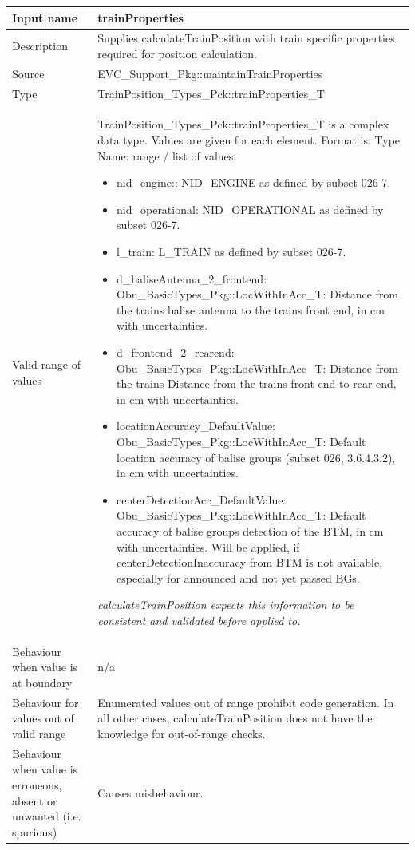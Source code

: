 \begin{longtable}{p{}p{}}
\toprule
Input name				& trainProperties \\
\midrule
Description				& Supplies calculateTrainPosition with train specific properties required for position calculation.   \\
\midrule
Source					& EVC\_Support\_Pkg::maintainTrainProperties \\ 
\midrule
Type					& TrainPosition\_Types\_Pck::trainProperties\_T \\  
\midrule
Valid range of values	& TrainPosition\_Types\_Pck::trainProperties\_T is a complex data type. Values are given for each element. Format is: Type Name: range / list of values.
\begin{itemize}
\item nid\_engine:: NID\_ENGINE as defined by subset 026-7. 
\item nid\_operational: NID\_OPERATIONAL as defined by subset 026-7. 
\item l\_train: L\_TRAIN as defined by subset 026-7. 
\item d\_baliseAntenna\_2\_frontend: Obu\_BasicTypes\_Pkg::LocWithInAcc\_T:  Distance from the trains balise antenna to the trains front end, in cm with uncertainties. 
\item d\_frontend\_2\_rearend: Obu\_BasicTypes\_Pkg::LocWithInAcc\_T:  Distance from the trains Distance from the trains front end to rear end, in cm with uncertainties. 
\item locationAccuracy\_DefaultValue: Obu\_BasicTypes\_Pkg::LocWithInAcc\_T:  Default location accuracy of balise groups (subset 026, 3.6.4.3.2), in cm with uncertainties. 
\item centerDetectionAcc\_DefaultValue: Obu\_BasicTypes\_Pkg::LocWithInAcc\_T:  Default  accuracy of balise groups detection of the BTM, in cm with uncertainties. Will be applied, if centerDetectionInaccuracy from BTM is not available, especially for announced and not yet passed BGs. 
\end{itemize} 
\emph{calculateTrainPosition expects this information to be consistent and validated before applied to.}\\
\midrule
Behaviour when value is at boundary	& n/a \\
\midrule
Behaviour for values out of valid range	& Enumerated values out of range prohibit code generation. In all other cases, calculateTrainPosition does not have the knowledge for out-of-range checks. \\
\midrule
Behaviour when value is erroneous, absent or unwanted (i.e. spurious) & Causes misbehaviour.
\\
\bottomrule
\end{longtable}



